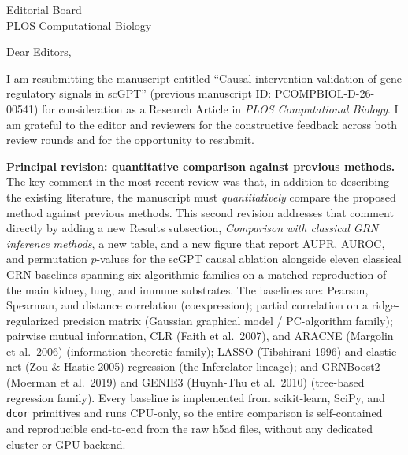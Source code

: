\documentclass[11pt,letterpaper]{letter}
\begin{document}
\begin{letter}{Editorial Board\\
PLOS Computational Biology}

\opening{Dear Editors,}

I am resubmitting the manuscript entitled ``Causal intervention validation
of gene regulatory signals in scGPT'' (previous manuscript ID:
PCOMPBIOL-D-26-00541) for consideration as a Research Article in
\textit{PLOS Computational Biology}. I am grateful to the editor and
reviewers for the constructive feedback across both review rounds and
for the opportunity to resubmit.

\textbf{Principal revision: quantitative comparison against previous
methods.} The key comment in the most recent review was that, in addition
to describing the existing literature, the manuscript must
\textit{quantitatively} compare the proposed method against previous
methods. This second revision addresses that comment directly by adding a
new Results subsection, \textit{Comparison with classical GRN inference
methods}, a new table, and a new figure that report AUPR, AUROC, and
permutation $p$-values for the scGPT causal ablation alongside eleven
classical GRN baselines spanning six algorithmic families on a matched
reproduction of the main kidney, lung, and immune substrates. The
baselines are: Pearson, Spearman, and distance correlation (coexpression);
partial correlation on a ridge-regularized precision matrix (Gaussian
graphical model / PC-algorithm family); pairwise mutual information, CLR
(Faith et al.\ 2007), and ARACNE (Margolin et al.\ 2006)
(information-theoretic family); LASSO (Tibshirani 1996) and elastic net
(Zou \& Hastie 2005) regression (the Inferelator lineage); and GRNBoost2
(Moerman et al.\ 2019) and GENIE3 (Huynh-Thu et al.\ 2010) (tree-based
regression family). Every baseline is implemented from scikit-learn,
SciPy, and \texttt{dcor} primitives and runs CPU-only, so the entire
comparison is self-contained and reproducible end-to-end from the raw
h5ad files, without any dedicated cluster or GPU backend.


\end{letter}
\end{document}
